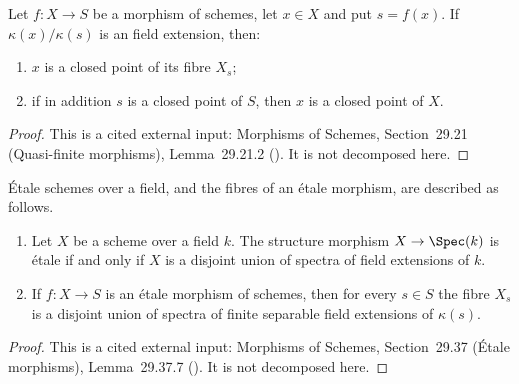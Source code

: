 \begin{lemma}
\label{lem:pc-algebraic-residue-closed-point}
Let $f:X\to S$ be a morphism of schemes, let $x\in X$ and put $s=f(x)$.
If $\kappa(x)/\kappa(s)$ is an
 field extension, then:
\begin{enumerate}
\item $x$ is a closed point of its fibre $X_s$;
\item if in addition $s$ is a closed point of $S$, then $x$ is a closed
point of $X$.
\end{enumerate}
\end{lemma}
\begin{proof}
This is a cited external input: Morphisms of Schemes, Section~29.21
(Quasi-finite morphisms), Lemma~29.21.2
().  It is not decomposed
here.
\end{proof}

\begin{lemma}
\label{lem:pc-etale-fibres-separable}
\'Etale schemes over a field, and the fibres of an \'etale morphism,
are described as follows.
\begin{enumerate}
\item Let $X$ be a scheme over a field $k$.  The structure morphism
$X\to\Spec(k)$ is \'etale if and only if $X$ is a disjoint union of
spectra of  field
extensions of $k$.
\item If $f:X\to S$ is an \'etale morphism of schemes, then for every
$s\in S$ the fibre $X_s$ is a disjoint union of spectra of finite
separable field extensions of $\kappa(s)$.
\end{enumerate}
\end{lemma}
\begin{proof}
This is a cited external input: Morphisms of Schemes, Section~29.37
(\'Etale morphisms), Lemma~29.37.7
().  It is not decomposed
here.
\end{proof}

